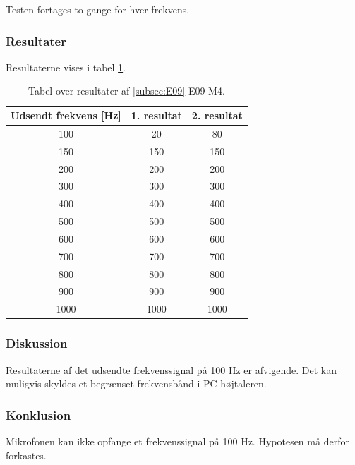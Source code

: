 			Testen fortages to gange for hver frekvens.  
		
		\subsubsection{Resultater}
		Resultaterne vises i tabel \ref{E09resultater}. 
		\begin{table}[]
				\centering
				\caption{Tabel over resultater af \ref{subsec:E09} E09-M4.} 
				\label{E09resultater}
				\begin{tabular}{ccc}
					\multicolumn{1}{c|}{\textbf{Udsendt frekvens {[}Hz{]}}} & 	
					\multicolumn{1}{c|}{\textbf{1. resultat}} & \textbf{2. resultat} \\ \hline
					\multicolumn{1}{c|}{100}& 
					\multicolumn{1}{c|}{20}&80\\
					\multicolumn{1}{c|}{150}& 
					\multicolumn{1}{c|}{150}&150\\
					\multicolumn{1}{c|}{200}& 
					\multicolumn{1}{c|}{200}&200\\
					\multicolumn{1}{c|}{300}& 
					\multicolumn{1}{c|}{300}&300\\
					\multicolumn{1}{c|}{400}& 
					\multicolumn{1}{c|}{400}&400\\
					\multicolumn{1}{c|}{500}& 
					\multicolumn{1}{c|}{500}&500\\
					\multicolumn{1}{c|}{600}& 
					\multicolumn{1}{c|}{600}&600\\
					\multicolumn{1}{c|}{700}& 
					\multicolumn{1}{c|}{700}&700\\
					\multicolumn{1}{c|}{800}& 
					\multicolumn{1}{c|}{800}&800\\
					\multicolumn{1}{c|}{900}& 
					\multicolumn{1}{c|}{900}&900\\
					\multicolumn{1}{c|}{1000}& 
					\multicolumn{1}{c|}{1000}&1000\\
                   
				\end{tabular}
			\end{table}
		
		\subsubsection{Diskussion} 
		Resultaterne af det udsendte frekvenssignal på 100 Hz er afvigende. Det kan muligvis skyldes et begrænset frekvensbånd i PC-højtaleren. 
		\subsubsection{Konklusion}
	Mikrofonen kan ikke opfange et frekvenssignal på 100 Hz. Hypotesen må derfor forkastes.  
